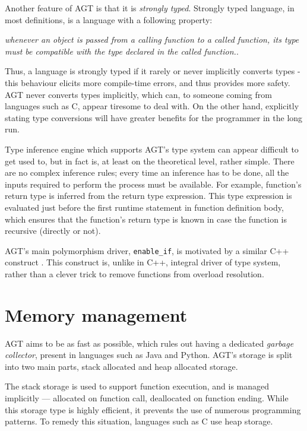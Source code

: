 \documentclass[times, utf8, diplomski]{fer}
\theoremstyle{definition}
\begin{document}
Another feature of AGT is that it is \textit{strongly typed}. 
Strongly typed language, in most definitions, is a language with a following property:
\begin{center}
    \textit{whenever an object is passed from a calling function 
    to a called function, its type must be compatible with 
    the type declared in the called function.}\citep{c_strong_typing}. 
\end{center}

Thus, a language is strongly typed if it rarely or never implicitly converts
types - this behaviour elicits more compile-time errors, and thus provides
more safety. AGT never converts types implicitly,
which can, to someone coming from languages such as C, appear tiresome to deal with. On the other hand,
explicitly stating type conversions will have greater benefits for the
programmer in the long run.

Type inference engine which supports AGT's type system can appear difficult to
get used to, but in fact is, at least on the theoretical level, rather simple.
There are no complex inference rules;
every time an inference has to be done, all the inputs required to perform the process must be available.
For example, function's return type is inferred from the return type expression. 
This type expression is evaluated
just before the first runtime statement in function definition body, which
ensures that the function's return type is known in case the function is
recursive (directly or not).

AGT's main polymorphism driver, \texttt{enable\_if}, is motivated by a similar C++ construct
\citep{c_enable_if}. This construct is, unlike in C++, integral driver of type system,
rather than a clever trick to remove functions from overload resolution.

\section{Memory management}

AGT aims to be as fast as possible, which rules out having a dedicated \textit{garbage collector},
present in languages such as Java and Python. AGT's storage is split into two main parts,
stack allocated and heap allocated storage. 

The stack storage is used to support function
execution, and is managed implicitly --- allocated on function call, deallocated on function ending.
While this storage type is highly efficient, it prevents the use of numerous programming patterns.
To remedy this situation, languages such as C use heap storage. 
\end{document}
